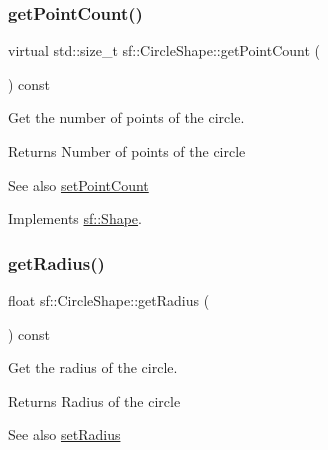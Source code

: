 \subsubsection{\texorpdfstring{getPointCount()}{getPointCount()}}
{\footnotesize\ttfamily virtual std\+::size\+\_\+t sf\+::\+Circle\+Shape\+::get\+Point\+Count (\begin{DoxyParamCaption}{ }\end{DoxyParamCaption}) const\hspace{0.3cm}{\ttfamily [virtual]}}



Get the number of points of the circle. 

\begin{DoxyReturn}{Returns}
Number of points of the circle
\end{DoxyReturn}
\begin{DoxySeeAlso}{See also}
\mbox{\hyperlink{classsf_1_1_circle_shape_a16590ee7bdf5c9f752275468a4997bed}{set\+Point\+Count}} \begin{DoxyVerb}\end{DoxyVerb}
 
\end{DoxySeeAlso}


Implements \mbox{\hyperlink{classsf_1_1_shape_af988dd61a29803fc04d02198e44b5643}{sf\+::\+Shape}}.

\mbox{\label{classsf_1_1_circle_shape_aa3dd5a1b5031486ce5b6f09d43674aa3}} 
\subsubsection{\texorpdfstring{getRadius()}{getRadius()}}
{\footnotesize\ttfamily float sf\+::\+Circle\+Shape\+::get\+Radius (\begin{DoxyParamCaption}{ }\end{DoxyParamCaption}) const}



Get the radius of the circle. 

\begin{DoxyReturn}{Returns}
Radius of the circle
\end{DoxyReturn}
\begin{DoxySeeAlso}{See also}
\mbox{\hyperlink{classsf_1_1_circle_shape_a21cdf85fc2f201e10222a241af864be0}{set\+Radius}} \begin{DoxyVerb}\end{DoxyVerb}
 
\end{DoxySeeAlso}
\mbox{\label{classsf_1_1_circle_shape_a16590ee7bdf5c9f752275468a4997bed}} 
